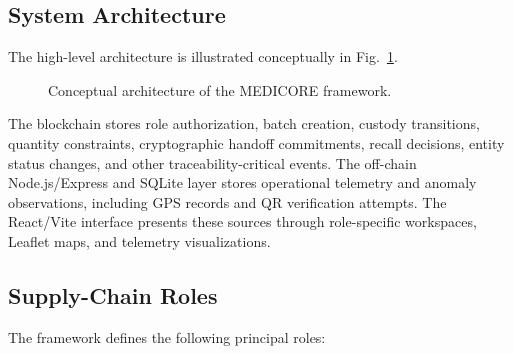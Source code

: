 \documentclass[11pt,a4paper]{article}
\begin{document}
\subsection{System Architecture}
The high-level architecture is illustrated conceptually in Fig.~\ref{fig:arch}.

\begin{figure}[htbp]
\centering
{}
\caption{Conceptual architecture of the MEDICORE framework.}
\label{fig:arch}
\end{figure}

The blockchain stores role authorization, batch creation, custody transitions, quantity constraints, cryptographic handoff commitments, recall decisions, entity status changes, and other traceability-critical events. The off-chain Node.js/Express and SQLite layer stores operational telemetry and anomaly observations, including GPS records and QR verification attempts. The React/Vite interface presents these sources through role-specific workspaces, Leaflet maps, and telemetry visualizations.

\subsection{Supply-Chain Roles}
The framework defines the following principal roles:
\end{document}
